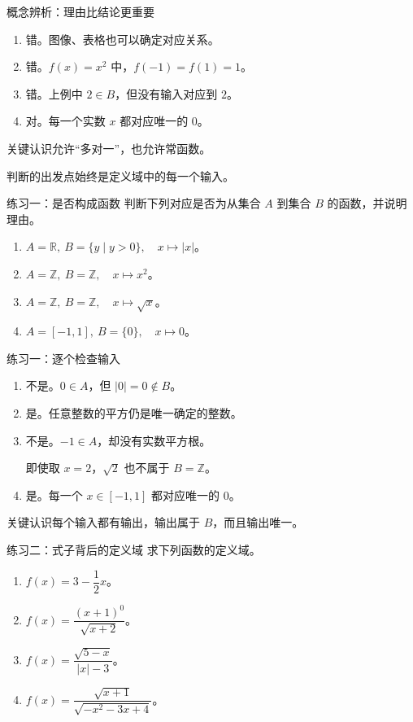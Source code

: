 \documentclass[aspectratio=169,10pt]{beamer}
\newcommand{\R}{\mathbb R}
\newcommand{\Z}{\mathbb Z}
\newcommand{\src}[1]{}
\newcommand{\key}[1]{\begin{block}{关键认识}#1\end{block}}
\begin{document}
\begin{frame}[t]{概念辨析：理由比结论更重要}
\begin{enumerate}
\item 错。图像、表格也可以确定对应关系。
\item 错。$f(x)=x^2$ 中，$f(-1)=f(1)=1$。
\item 错。上例中 $2\in B$，但没有输入对应到 $2$。
\item 对。每一个实数 $x$ 都对应唯一的 $0$。
\end{enumerate}
\key{允许“多对一”，也允许常函数。\par
判断的出发点始终是定义域中的每一个输入。}
\end{frame}
\begin{frame}[t]{练习一：是否构成函数}
判断下列对应是否为从集合 $A$ 到集合 $B$ 的函数，并说明理由。
\begin{enumerate}
\item $A=\R,\ B=\{y\mid y>0\},\quad x\mapsto |x|$。
\item $A=\Z,\ B=\Z,\quad x\mapsto x^2$。
\item $A=\Z,\ B=\Z,\quad x\mapsto \sqrt{x}$。
\item $A=[-1,1],\ B=\{0\},\quad x\mapsto 0$。
\end{enumerate}
\src{《三维设计》必修第一册第31页典例1。}
\end{frame}
\begin{frame}[t]{练习一：逐个检查输入}
\begin{enumerate}
\item 不是。$0\in A$，但 $|0|=0\notin B$。
\item 是。任意整数的平方仍是唯一确定的整数。
\item 不是。$-1\in A$，却没有实数平方根。\par
即使取 $x=2$，$\sqrt2$ 也不属于 $B=\Z$。
\item 是。每一个 $x\in[-1,1]$ 都对应唯一的 $0$。
\end{enumerate}
\key{每个输入都有输出，输出属于 $B$，而且输出唯一。}
\end{frame}
\begin{frame}[t]{练习二：式子背后的定义域}
求下列函数的定义域。
\begin{enumerate}
\item $f(x)=3-\dfrac12x$。
\item $f(x)=\dfrac{(x+1)^0}{\sqrt{x+2}}$。
\item $f(x)=\dfrac{\sqrt{5-x}}{|x|-3}$。
\item $f(x)=\dfrac{\sqrt{x+1}}{\sqrt{-x^2-3x+4}}$。
\end{enumerate}
\src{《三维设计》第31页典例2。按高中实数运算约定，零次幂的底数不能为0。}
\end{frame}
\end{document}
